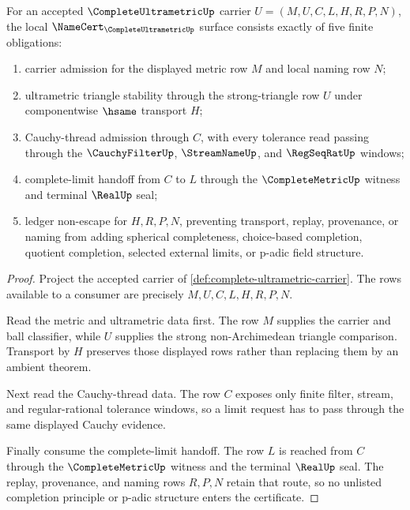 \begin{theorem}
\label{thm:complete-ultrametric-namecert-obligations}
For an accepted $\CompleteUltrametricUp$ carrier $U=(M,U,C,L,H,R,P,N)$, the local $\NameCert_{\CompleteUltrametricUp}$ surface consists exactly of five finite obligations:
\begin{enumerate}
\item carrier admission for the displayed metric row $M$ and local naming row $N$;
\item ultrametric triangle stability through the strong-triangle row $U$ under componentwise $\hsame$ transport $H$;
\item Cauchy-thread admission through $C$, with every tolerance read passing through the $\CauchyFilterUp$, $\StreamNameUp$, and $\RegSeqRatUp$ windows;
\item complete-limit handoff from $C$ to $L$ through the $\CompleteMetricUp$ witness and terminal $\RealUp$ seal;
\item ledger non-escape for $H,R,P,N$, preventing transport, replay, provenance, or naming from adding spherical completeness, choice-based completion, quotient completion, selected external limits, or p-adic field structure.
\end{enumerate}
\end{theorem}
\begin{proof}
Project the accepted carrier of \autoref{def:complete-ultrametric-carrier}. The rows available to a consumer are precisely $M,U,C,L,H,R,P,N$.

Read the metric and ultrametric data first. The row $M$ supplies the carrier and ball classifier, while $U$ supplies the strong non-Archimedean triangle comparison. Transport by $H$ preserves those displayed rows rather than replacing them by an ambient theorem.

Next read the Cauchy-thread data. The row $C$ exposes only finite filter, stream, and regular-rational tolerance windows, so a limit request has to pass through the same displayed Cauchy evidence.

Finally consume the complete-limit handoff. The row $L$ is reached from $C$ through the $\CompleteMetricUp$ witness and the terminal $\RealUp$ seal. The replay, provenance, and naming rows $R,P,N$ retain that route, so no unlisted completion principle or p-adic structure enters the certificate.
\end{proof}


